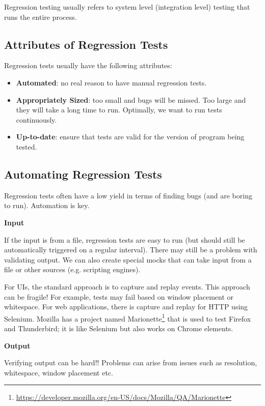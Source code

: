 \documentclass[11pt]{article}
\begin{document}
Regression testing usually refers to system level (integration level) testing that runs the entire process.

\subsection*{Attributes of Regression Tests}

Regression tests usually have the following attributes:

\begin{itemize}[noitemsep]
\item \textbf{Automated}: no real reason to have manual regression tests.
\item \textbf{Appropriately Sized}: too small and bugs will be missed. Too large and they will take a long time to run. Optimally, we want to run tests continuously.
\item \textbf{Up-to-date}: ensure that tests are valid for the version of program being tested.

\end{itemize}

\subsection*{Automating Regression Tests}

Regression tests often have a low yield in terms of finding bugs (and are boring to run). Automation is key.

\textbf{Input}

If the input is from a file, regression tests are easy to run (but should still be automatically triggered on a regular interval). There may still be a problem with validating output. We can also create special mocks that can take input from a file or other sources (e.g. scripting engines). 

For UIs, the standard approach is to capture and replay events. This approach can be fragile! For example, tests may fail based on window placement or whitespace. For web applications, there is capture and replay for HTTP using Selenium. Mozilla has a project named Marionette\footnote{\url{https://developer.mozilla.org/en-US/docs/Mozilla/QA/Marionette}} that is used to test Firefox and Thunderbird; it is like Selenium but also works on Chrome elements. 

\textbf{Output}

Verifying output can be hard!! Problems can arise from issues such as resolution, whitespace, window placement etc. 
\end{document}
